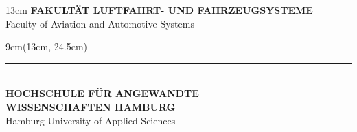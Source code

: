 {\begin{textblock*}{13cm}
{     %
     \selectfont
     \fontsize{9pt}{11pt}\selectfont
     \textbf{\uppercase{Fakultät Luftfahrt- und Fahrzeugsysteme}}\\[0.8cm]

     Faculty of Aviation and Automotive Systems\\
    }%
  \end{textblock*}

  \begin{textblock*}{9cm}(13cm, 24.5cm)
    {%
     \selectfont\color{HAWBlue}%
     \rule{0.8cm}{1.5pt}\\
     \fontsize{9pt}{11pt}\selectfont
     \textbf{HOCHSCHULE FÜR ANGEWANDTE}\\
     \textbf{WISSENSCHAFTEN HAMBURG}\\
     {\small Hamburg University of Applied Sciences}%
    }%
  \end{textblock*}
  \null\newpage
}



\newcommand{\hawtitelpage}{
{\fontfamily{phv}\selectfont \thispagestyle{empty}
\newgeometry{left=3.5cm,bottom=3.5cm,top=5cm}
\noindent\hfil
  \begin{minipage}{12cm}
    \fontsize{18pt}{20pt}
    \selectfont
    \begin{center}
     \bfseries \Autor \\
     \vspace{10pt}
     \bfseries \Titel
    \end{center}
  \end{minipage}
  

      \vfill
      \fontfamily{phv}\selectfont
      \fontsize{12pt}{13pt}
      \selectfont
        
      
        \Dokumentenart ~eingereicht im Rahmen der \Pruefungsart \\ \\
	    im Studiengang Flugzeugbau \\
        an der Fakultät Luftfahrt- und Fahrzeugsysteme\\
        der Hochschule für Angewandte Wissenschaften Hamburg\\
        \\
        \Firma\\ 
        \\
        \Erstpruefer \\
        \Zweitpruefer \\
        \\
        \Betreuer \\ 
        \\
        Abgabedatum: \Datum 
      
\restoregeometry
}
}